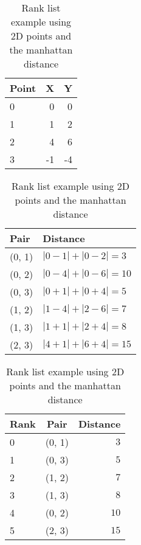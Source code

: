 \begin{table}
  \centering
  \caption{Rank list example using 2D points and the manhattan distance}
  \label{tab:rank_list_example}

  \begin{tabular}{l r r}
    \toprule
    Point & X & Y \\
    \midrule
    0 & 0 & 0 \\
    1 & 1 & 2 \\
    2 & 4 & 6 \\
    3 & -1 & -4 \\
    \bottomrule
  \end{tabular}

  \begin{tabular}{l l}
    \toprule
    Pair & Distance \\
    \midrule
    (0, 1) & $|0-1| + |0-2| = 3$ \\
    (0, 2) & $|0-4| + |0-6| = 10$ \\
    (0, 3) & $|0+1| + |0+4| = 5$ \\
    (1, 2) & $|1-4| + |2-6| = 7$ \\
    (1, 3) & $|1+1| + |2+4| = 8$ \\
    (2, 3) & $|4+1| + |6+4| = 15$ \\
    \bottomrule
  \end{tabular}

  \begin{tabular}{l c r}
    \toprule
    Rank & Pair & Distance \\
    \midrule
    0 & (0, 1) & $3$ \\
    1 & (0, 3) & $5$ \\
    2 & (1, 2) & $7$ \\
    3 & (1, 3) & $8$ \\
    4 & (0, 2) & $10$ \\
    5 & (2, 3) & $15$ \\
    \bottomrule
  \end{tabular}
\end{table}
